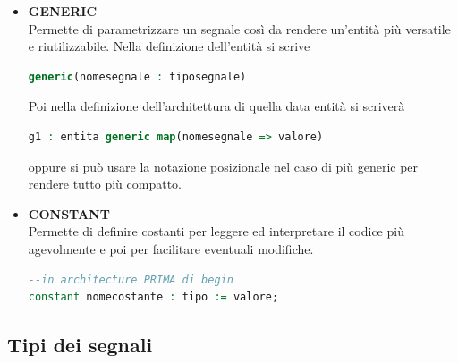 \documentclass[a4paper]{book}
\begin{document}
\begin{itemize}
\item\textbf{GENERIC}\\
Permette di parametrizzare un segnale così da rendere un'entità più versatile e riutilizzabile.
Nella definizione dell'entità si scrive
\begin{lstlisting}[language=VHDL]
generic(nomesegnale : tiposegnale)
\end{lstlisting}
Poi nella definizione dell'architettura di quella data entità si scriverà 
\begin{lstlisting}[language=VHDL]
g1 : entita generic map(nomesegnale => valore)
\end{lstlisting}
oppure si può usare la notazione posizionale nel caso di più generic per rendere tutto più compatto.

\item\textbf{CONSTANT}\\
Permette di definire costanti per leggere ed interpretare il codice più agevolmente e poi per facilitare eventuali modifiche.

\begin{lstlisting}[language=VHDL]
--in architecture PRIMA di begin
constant nomecostante : tipo := valore;
\end{lstlisting}
\end{itemize}


\subsection{Tipi dei segnali}
\end{document}
